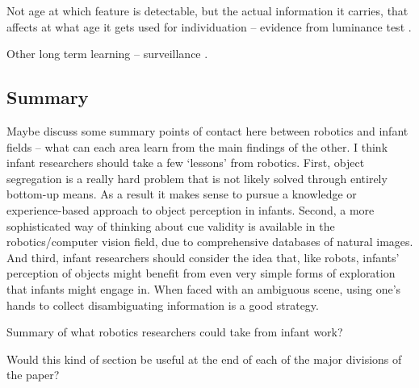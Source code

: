 Not age at which feature is detectable, but the actual
information it carries, that affects at what age it gets used for
individuation -- evidence from luminance test \cite{woods05infants}.

Other long term learning -- surveillance \cite{stauffer00learning}.

\subsection{Summary}

Maybe discuss some summary points of contact here between robotics and
infant fields -- what can each area learn from the main findings
of the other.  I think infant researchers should take a few
`lessons' from robotics.  First, object segregation is
a really hard problem that is not likely solved through entirely
bottom-up means.  As a result it makes sense to pursue a knowledge or
experience-based approach to object perception in infants.  Second, a
more sophisticated way of thinking about cue validity is available in
the robotics/computer vision field, due to comprehensive databases of
natural images.  And third, infant researchers should consider the
idea that, like robots, infants' perception of objects might
benefit from even very simple forms of exploration that infants might
engage in.  When faced with an ambiguous scene, using one's
hands to collect disambiguating information is a good strategy.

Summary of what robotics researchers could take from infant work?

Would this kind of section be useful at the end of each of the major
divisions of the paper?


\fi
